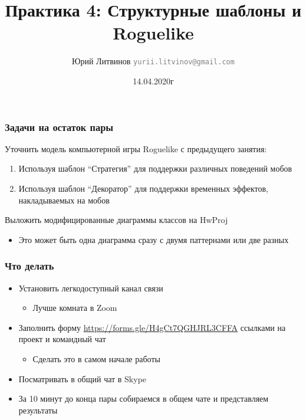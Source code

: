 \documentclass[xetex,mathserif,serif]{beamer}
\title{Практика 4: Структурные шаблоны и Roguelike}
\author[Юрий Литвинов]{Юрий Литвинов \newline \textcolor{gray}{\small\texttt{yurii.litvinov@gmail.com}}}
\date{14.04.2020г}
\begin{document}
	
	\frame{\titlepage}

	\begin{frame}
		\frametitle{Задачи на остаток пары}
		Уточнить модель компьютерной игры Roguelike с предыдущего занятия:

		\begin{enumerate}
			\item Используя шаблон ``Стратегия'' для поддержки различных поведений мобов
			\item Используя шаблон ``Декоратор'' для поддержки временных эффектов, накладываемых на мобов
		\end{enumerate}

		Выложить модифицированные диаграммы классов на HwProj

		\begin{itemize}
			\item Это может быть одна диаграмма сразу с двумя паттернами или две разных
		\end{itemize}
	\end{frame}

	\begin{frame}
		\frametitle{Что делать}
		\begin{itemize}
			\item Установить легкодоступный канал связи
			\begin{itemize}
				\item Лучше комната в Zoom
			\end{itemize}
			\item Заполнить форму \url{https://forms.gle/H4gCt7QGHJRL3CFFA} ссылками на проект и командный чат
			\begin{itemize}
				\item Сделать это в самом начале работы
			\end{itemize}
			\item Посматривать в общий чат в Skype
			\item За 10 минут до конца пары собираемся в общем чате и представляем результаты
		\end{itemize}
	\end{frame}
\end{document}
